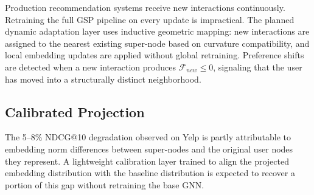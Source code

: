Production recommendation systems receive new interactions continuously. Retraining the full GSP pipeline on every update is impractical. The planned dynamic adaptation layer uses inductive geometric mapping: new interactions are assigned to the nearest existing super-node based on curvature compatibility, and local embedding updates are applied without global retraining. Preference shifts are detected when a new interaction produces $\mathcal{F}_{new} \le 0$, signaling that the user has moved into a structurally distinct neighborhood.

\subsection*{Calibrated Projection}

The 5--8\% NDCG@10 degradation observed on Yelp is partly attributable to embedding norm differences between super-nodes and the original user nodes they represent. A lightweight calibration layer trained to align the projected embedding distribution with the baseline distribution is expected to recover a portion of this gap without retraining the base GNN.








